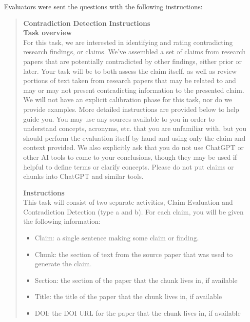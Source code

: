 \documentclass{article}
\begin{document}
Evaluators were sent the questions with the following instructions:  \\
\begin{quote}
\textbf{Contradiction Detection Instructions} \\
\textbf{Task overview}\\ 
For this task, we are interested in identifying and rating contradicting research findings, or claims. We’ve assembled a set of claims from research papers that are potentially contradicted by other findings, either prior or later. Your task will be to both assess the claim itself, as well as review portions of text taken from research papers that may be related to and may or may not present contradicting information to the presented claim.
We will not have an explicit calibration phase for this task, nor do we provide examples. More detailed instructions are provided below to help guide you. You may use any sources available to you in order to understand concepts, acronyms, etc. that you are unfamiliar with, but you should perform the evaluation itself by-hand and using only the claim and context provided.
We also explicitly ask that you do not use ChatGPT or other AI tools to come to your conclusions, though they may be used if helpful to define terms or clarify concepts. Please do not put claims or chunks into ChatGPT and similar tools.

\textbf{Instructions}\\
This task will consist of two separate activities, Claim Evaluation and Contradiction Detection (type a and b). For each claim, you will be given the following information:
\begin{itemize}
    \item Claim: a single sentence making some claim or finding.
    \item Chunk: the section of text from the source paper that was used to generate the claim.
    \item Section: the section of the paper that the chunk lives in, if available
    \item Title: the title of the paper that the chunk lives in, if available
    \item DOI: the DOI URL for the paper that the chunk lives in, if available
\end{itemize}


\end{quote}
\end{document}
